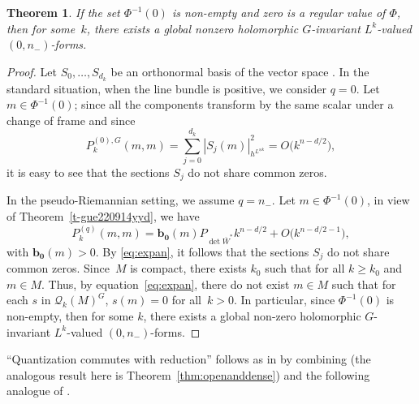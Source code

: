\documentclass[10pt,a4paper]{amsart}
\numberwithin{equation}{section}
\newtheorem{Theorem}{Theorem}[section]
\begin{document}
 	\begin{Theorem}\label{thm:2}
 		If the set $\Phi^{-1}(0)$ is non-empty and zero is a regular value of $\Phi$, then for some~$k$, there exists a global nonzero holomorphic $G$-invariant $L^k$-valued $(0, n_-)$-forms.
 	\end{Theorem}
	\begin{proof}
		Let $S_0, \dots, S_{d_k}$ be an orthonormal basis of the vector space . In the standard situation, when the line bundle is positive, we consider $q=0$. Let $m \in \Phi^{-1}(0)$; since all the components transform by the same scalar under a change of frame and since
			\[P^{(0),G}_k(m, m) = \sum_{j=0}^{d_k} |S_j(m)|^2_{h^{L^{\otimes k}}}=O\bigl(k^{n-d/2}\bigr) , \]
		it is easy to see that the sections $S_j$ do not share common zeros.
		
		In the pseudo-Riemannian setting, we assume $q=n_-$. Let $m \in \Phi^{-1}(0)$, in view of Theorem~\ref{t-gue220914yyd}, we have
		\begin{equation} \label{eq:expan}
			P_k^{(q)}(m,m)= \mathbf{b_0}(m) P_{\det \overline{W}^*} k^{n-d/2} + O\bigl(k^{n-d/2-1}\bigr) ,
		\end{equation}
		with $\mathbf{b_0}(m)> 0$. By \eqref{eq:expan}, it follows that the sections $S_j$ do not share common zeros. Since~$M$ is compact, there exists $k_0$ such that  for all $k\geq k_0$ and $m\in M$. Thus, by equation~\eqref{eq:expan}, there do not exist $m\in M$ such that for each $s$ in $\mathcal{Q}_k(M)^G$, $s(m)=0$ for all~${k>0}$. In particular, since $\Phi^{-1}(0)$ is non-empty, then for some $k$, there exists a global non-zero holomorphic $G$-invariant $L^k$-valued $(0, n_-)$-forms.
	\end{proof}

	 ``Quantization commutes with reduction'' follows as in \cite{gs} by combining \cite[Theorem 5.7]{gs} (the analogous result here is Theorem~\ref{thm:openanddense}) and the following analogue of \cite[Theorem 5.8]{gs}.
	
\end{document}
